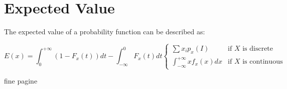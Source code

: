 \section{Expected Value}

    The expected value of a probability function can be described as:

        \begin{equation}
            E(x)= \int_{0}^{+\infty} (1-F_x(t)) dt - \int_{-\infty}^{0} F_{x}(t) dt \begin{cases}
                \sum x_i p_x (I) & \mbox{if $X$ is discrete} \\ \int_{-\infty}^{+\infty} x f_x(x) dx & \mbox{if $X$ is continuous} \end{cases}
        \end{equation}




        
        fine pagine